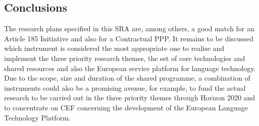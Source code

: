 \documentclass[10pt, plain]{../../metanetpaper}
\begin{document}
\begin{multicols}{2}
\subsection{Conclusions}
\label{sec:funding-conclusions}

The research plans specified in this SRA are, among others, a good match for an Article 185 Initiative and also for a Contractual PPP. It remains to be discussed which instrument is considered the most appropriate one to realise and implement the three priority research themes, the set of core technologies and shared resources and also the European service platform for language technology. Due to the scope, size and duration of the shared programme, a combination of instruments could also be a promising avenue, for example, to fund the actual research to be carried out in the three priority themes through Horizon 2020 and to concentrate on CEF concerning the development of the European Language Technology Platform.


\end{multicols}

\clearpage


\appendix
{}



\begin{footnotesize}


\end{footnotesize}
\end{document}
